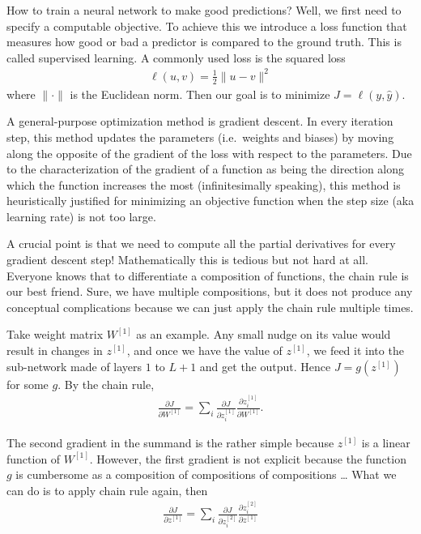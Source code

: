 \documentclass[
  letterpaper,
  DIV=11,
  numbers=noendperiod]{scrartcl}
\begin{document}
How to train a neural network to make good predictions? Well, we first
need to specify a computable objective. To achieve this we introduce a
loss function that measures how good or bad a predictor is compared to
the ground truth. This is called supervised learning. A commonly used
loss is the squared loss \begin{align*}
    \ell(u,v) =  \frac{1}{2} \|u-v\|^2
\end{align*} where \(\|\cdot\|\) is the Euclidean norm. Then our goal is
to minimize \(J=\ell(y,\hat y)\).

A general-purpose optimization method is gradient descent. In every
iteration step, this method updates the parameters (i.e.~weights and
biases) by moving along the opposite of the gradient of the loss with
respect to the parameters. Due to the characterization of the gradient
of a function as being the direction along which the function increases
the most (infinitesimally speaking), this method is heuristically
justified for minimizing an objective function when the step size (aka
learning rate) is not too large.

A crucial point is that we need to compute all the partial derivatives
for every gradient descent step! Mathematically this is tedious but not
hard at all. Everyone knows that to differentiate a composition of
functions, the chain rule is our best friend. Sure, we have multiple
compositions, but it does not produce any conceptual complications
because we can just apply the chain rule multiple times.

Take weight matrix \(W^{[1]}\) as an example. Any small nudge on its
value would result in changes in \(z^{[1]}\), and once we have the value
of \(z^{[1]}\), we feed it into the sub-network made of layers \(1\) to
\(L+1\) and get the output. Hence \(J=g(z^{[1]})\) for some \(g\). By
the chain rule,\\
\begin{align*}
    \frac{\partial J}{\partial W^{[1]}} =  
    \sum_i \frac{\partial J}{\partial z^{[1]}_i} \frac{\partial z^{[1]}_i}{\partial W^{[1]}}. 
\end{align*}

The second gradient in the summand is the rather simple because
\(z^{[1]}\) is a linear function of \(W^{[1]}\). However, the first
gradient is not explicit because the function \(g\) is cumbersome as a
composition of compositions of compositions \ldots{} What we can do is
to apply chain rule again, then \begin{align*}
    \frac{\partial J}{\partial z^{[1]}}
    = \sum_i \frac{\partial J}{\partial z^{[2]}_i} \frac{\partial z^{[2]}_i}{\partial z^{[1]}} 
\end{align*}
\end{document}
